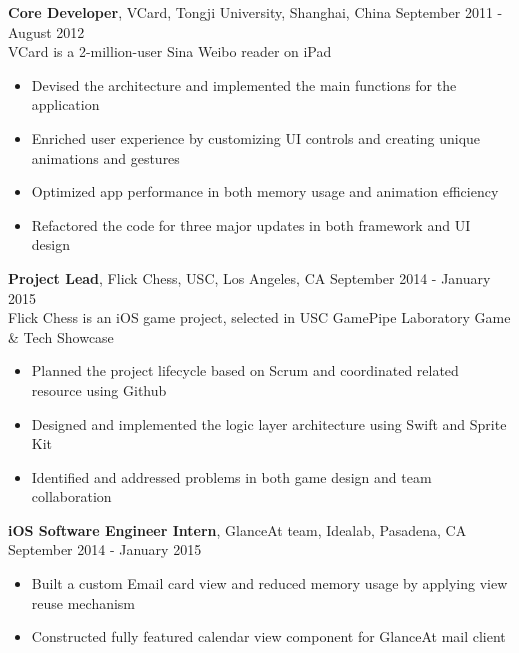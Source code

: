 \documentclass[line, overlapped]{res}
\begin{document}
\begin{resume}
\begin{itemize}
 \end{itemize}

\textbf{Core Developer}, VCard, Tongji University, Shanghai, China \hfill September 2011 - August 2012\\
 VCard is a 2-million-user Sina Weibo reader on iPad
 \begin{itemize} \itemsep -2pt  %

  \item Devised the architecture and implemented the main functions for the application

  \item Enriched user experience by customizing UI controls and creating unique animations and gestures

  \item Optimized app performance in both memory usage and animation efficiency

  \item Refactored the code for three major updates in both framework and UI design

 \end{itemize}
 
\textbf{Project Lead}, Flick Chess, USC, Los Angeles, CA \hfill September 2014 - January 2015\\
Flick Chess is an iOS game project, selected in USC GamePipe Laboratory Game \& Tech Showcase
\begin{itemize} \itemsep -2pt %
  \item Planned the project lifecycle based on Scrum and coordinated related resource using Github
  
  \item Designed and implemented the logic layer architecture using Swift and Sprite Kit
  
  \item Identified and addressed problems in both game design and team collaboration

\end{itemize}
 
 \textbf{iOS Software Engineer Intern}, GlanceAt team, Idealab, Pasadena, CA \hfill September 2014 - January 2015
 \begin{itemize} \itemsep -2pt
 
 \item Built a custom Email card view and reduced memory usage by applying view reuse mechanism
 
 \item Constructed fully featured calendar view component for GlanceAt mail client
 

\end{itemize}
\end{resume}
\end{document}
